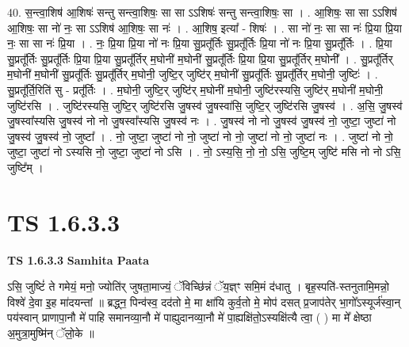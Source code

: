 \documentclass[17pt]{extarticle}
\begin{document}
40. स॒न्त्वा॒शिष॑ आ॒शिषः॑ सन्तु सन्त्वा॒शिषः॒ सा सा ऽऽशिषः॑ सन्तु सन्त्वा॒शिषः॒ सा । . आ॒शिषः॒ सा सा ऽऽशिष॑ आ॒शिषः॒ सा नो॑ नः॒ सा ऽऽशिष॑ आ॒शिषः॒ सा नः॑ । . आ॒शिष॒ इत्या᳚ - शिषः॑ । . सा नो॑ नः॒ सा सा नः॑ प्रि॒या प्रि॒या नः॒ सा सा नः॑ प्रि॒या । . नः॒ प्रि॒या प्रि॒या नो॑ नः प्रि॒या सु॒प्रतू᳚र्तिः सु॒प्रतू᳚र्तिः प्रि॒या नो॑ नः प्रि॒या सु॒प्रतू᳚र्तिः । . प्रि॒या सु॒प्रतू᳚र्तिः सु॒प्रतू᳚र्तिः प्रि॒या प्रि॒या सु॒प्रतू᳚र्तिर् म॒घोनी॑ म॒घोनी॑ सु॒प्रतू᳚र्तिः प्रि॒या प्रि॒या सु॒प्रतू᳚र्तिर् म॒घोनी᳚ । . सु॒प्रतू᳚र्तिर् म॒घोनी॑ म॒घोनी॑ सु॒प्रतू᳚र्तिः सु॒प्रतू᳚र्तिर् म॒घोनी॒ जुष्टि॒र् जुष्टि॑र् म॒घोनी॑ सु॒प्रतू᳚र्तिः सु॒प्रतू᳚र्तिर् म॒घोनी॒ जुष्टिः॑ । . सु॒प्रतू᳚र्ति॒रिति॑ सु - प्रतू᳚र्तिः । . म॒घोनी॒ जुष्टि॒र् जुष्टि॑र् म॒घोनी॑ म॒घोनी॒ जुष्टि॑रस्यसि॒ जुष्टि॑र् म॒घोनी॑ म॒घोनी॒ जुष्टि॑रसि । . जुष्टि॑रस्यसि॒ जुष्टि॒र् जुष्टि॑रसि जु॒षस्व॑ जु॒षस्वा॑सि॒ जुष्टि॒र् जुष्टि॑रसि जु॒षस्व॑ । . अ॒सि॒ जु॒षस्व॑ जु॒षस्वा᳚स्यसि जु॒षस्व॑ नो नो जु॒षस्वा᳚स्यसि जु॒षस्व॑ नः । . जु॒षस्व॑ नो नो जु॒षस्व॑ जु॒षस्व॑ नो॒ जुष्टा॒ जुष्टा॑ नो जु॒षस्व॑ जु॒षस्व॑ नो॒ जुष्टा᳚ । . नो॒ जुष्टा॒ जुष्टा॑ नो नो॒ जुष्टा॑ नो नो॒ जुष्टा॑ नो नो॒ जुष्टा॑ नः । . जुष्टा॑ नो नो॒ जुष्टा॒ जुष्टा॑ नो ऽस्यसि नो॒ जुष्टा॒ जुष्टा॑ नो ऽसि । . नो॒ ऽस्य॒सि॒ नो॒ नो॒ ऽसि॒ जुष्टि॒म् जुष्टि॑ मसि नो नो ऽसि॒ जुष्टि᳚म् । \newline
\pagebreak
{}

\section{ TS 1.6.3.3 }

\textbf{TS 1.6.3.3 } \newline
\textbf{Samhita Paata} \newline

ऽसि॒ जुष्टिं॑ ते गमेयं॒ मनो॒ ज्योति॑र् जुषता॒माज्यं॒ ॅविच्छि॑न्नं ॅय॒ज्ञ्ꣳ समि॒मं द॑धातु । बृह॒स्पति॑-स्तनुतामि॒मन्नो॒ विश्वे॑ दे॒वा इ॒ह मा॑दयन्तां ॥ ब्रद्ध्न॒ पिन्व॑स्व॒ दद॑तो मे॒ मा क्षा॑यि कुर्व॒तो मे॒ मोप॑ दसत् प्र॒जाप॑तेर् भा॒गो᳚ऽस्यूर्ज॑स्वा॒न् पय॑स्वान् प्राणापा॒नौ मे॑ पाहि समानव्या॒नौ मे॑ पाह्युदानव्या॒नौ मे॑ पा॒ह्यक्षि॑तो॒ऽस्यक्षि॑त्यै त्वा॒ ( ) मा मे᳚ क्षेष्ठा अ॒मुत्रा॒मुष्मि॑न् ॅलो॒के ॥ \newline
\end{document}
